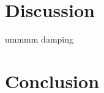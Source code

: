 \documentclass{article}
\begin{document}
\begin{figure}
	\centering
	\begin{subfigure}{.5\linewidth}
		\def\svgwidth{\linewidth}
		
	\end{subfigure}%
	\begin{subfigure}{.5\linewidth}
		\def\svgwidth{\linewidth}
		
	\end{subfigure}
	\caption{}
\end{figure}


\section{Discussion}

ummmm damping

\section{Conclusion}
\end{document}
